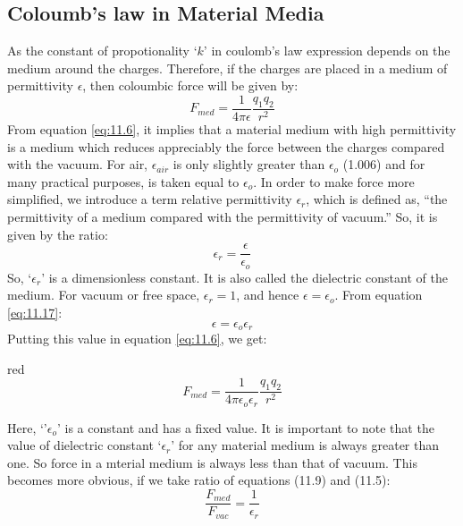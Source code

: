 \subsection{Coloumb’s law in Material Media}
As the constant of propotionality `$k$' in coulomb’s law expression depends on the medium
around the charges. Therefore, if the charges are placed in a medium
of permittivity $\epsilon$, then coloumbic force will be given by:
\begin{equation}\label{eq:11.6}
  F_{med} = \frac{1}{4\pi\epsilon} \frac{q_{1}q_{2}}{r^{2}}
\end{equation}
From equation \ref{eq:11.6}, it implies that a material medium
with high permittivity is a medium which reduces appreciably
the force between the charges compared with the vacuum. For air, $\epsilon_{air}$
is only slightly greater than $\epsilon_{o}$ (1.006) and for many practical purposes,
is taken equal to $\epsilon_{o}$.
In order to make force more simplified, we introduce a term relative permittivity $\epsilon_{r}$,
which is defined as, “the permittivity of a medium compared with the permittivity of vacuum.” So,
it is given by the ratio:
\begin{equation}\label{eq:11.7}
  \epsilon_{r} = \frac{\epsilon}{\epsilon_{o}}
\end{equation}
So, `$\epsilon_{r}$’ is a dimensionless constant.
It is also called the dielectric constant of the medium.
For vacuum or free space, $\epsilon_{r} = 1$, and hence $\epsilon = \epsilon_{o}$.
From equation \ref{eq:11.17}:
\begin{equation}\label{eq:11.8}
  \epsilon = \epsilon_{o}\epsilon_{r}
\end{equation}
Putting this value in equation \ref{eq:11.6}, we get:
\begin{mybox}{red}{}
\begin{equation}\label{eq:11.9}
  F_{med} = \frac{1}{4\pi\epsilon_{o}\epsilon_{r}} \frac{q_{1}q_{2}}{r^{2}}
\end{equation}
\end{mybox}
\noindent Here, `'$\epsilon_{o}$' is a constant and has a fixed value.
It is important to note that the value of dielectric constant `$\epsilon_{r}$'
for any material
medium is always greater than one. So force in a mterial medium
is always less than that of vacuum. This becomes more obvious,
if we take ratio of equations (11.9) and (11.5):
\begin{equation}\label{eq:11.10}
  \frac{F_{med}}{F_{vac}} = \frac{1}{\epsilon_{r}}
\end{equation}
